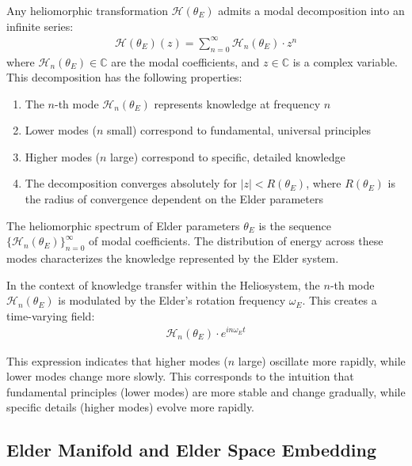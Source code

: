 \begin{theorem}
Any heliomorphic transformation $\mathcal{H}(\theta_E)$ admits a modal decomposition into an infinite series:
\begin{align}
\mathcal{H}(\theta_E)(z) = \sum_{n=0}^{\infty} \mathcal{H}_n(\theta_E) \cdot z^n
\end{align}
where $\mathcal{H}_n(\theta_E) \in \mathbb{C}$ are the modal coefficients, and $z \in \mathbb{C}$ is a complex variable. This decomposition has the following properties:
\begin{enumerate}
    \item The $n$-th mode $\mathcal{H}_n(\theta_E)$ represents knowledge at frequency $n$
    \item Lower modes ($n$ small) correspond to fundamental, universal principles
    \item Higher modes ($n$ large) correspond to specific, detailed knowledge
    \item The decomposition converges absolutely for $|z| < R(\theta_E)$, where $R(\theta_E)$ is the radius of convergence dependent on the Elder parameters
\end{enumerate}
\end{theorem}

\begin{definition}
The heliomorphic spectrum of Elder parameters $\theta_E$ is the sequence $\{\mathcal{H}_n(\theta_E)\}_{n=0}^{\infty}$ of modal coefficients. The distribution of energy across these modes characterizes the knowledge represented by the Elder system.
\end{definition}

In the context of knowledge transfer within the Heliosystem, the $n$-th mode $\mathcal{H}_n(\theta_E)$ is modulated by the Elder's rotation frequency $\omega_E$. This creates a time-varying field:
\begin{align}
\mathcal{H}_n(\theta_E) \cdot e^{in\omega_E t}
\end{align}

This expression indicates that higher modes ($n$ large) oscillate more rapidly, while lower modes change more slowly. This corresponds to the intuition that fundamental principles (lower modes) are more stable and change gradually, while specific details (higher modes) evolve more rapidly.

\subsection{Elder Manifold and Elder Space Embedding}

